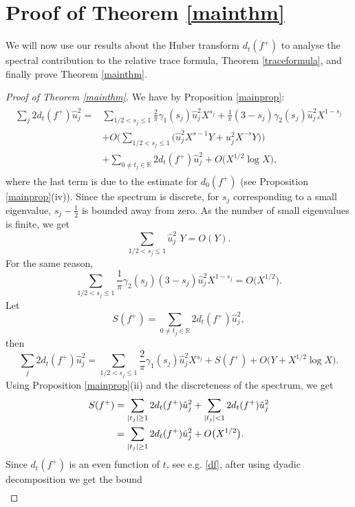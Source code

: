 \documentclass[a4paper,11pt]{amsart}
\theoremstyle{definition}
\begin{document}
\section{Proof of Theorem \ref{mainthm}}\label{Proof of counting}
We will now use our results about the Huber transform $d_t(f^{+})$ to analyse the spectral contribution to the relative trace formula, Theorem \ref{traceformula}, and finally prove Theorem \ref{mainthm}. 
\begin{proof}[Proof of Theorem \ref{mainthm}]
We have by Proposition \ref{mainprop}:
\begin{align}
    \begin{split}
        \sum_j2d_t(f^{+})\hat{u}_j^2=&\sum_{1/2<s_j\le1}\frac{2}{\pi}\gamma_1(s_j)\hat{u}_j^2X^{s_j}+\frac{1}{\pi}(3-s_j)\gamma_2(s_j)\hat{u}_j^2X^{1-s_j}\\
        &+O\Bigg(\sum_{1/2<s_j\le1}\Big(\hat{u}_j^2X^{s-1}Y+{u}_j^2X^{-s}Y\Big)\Bigg)\\
        &+\sum_{0\ne t_j\in \mathbb{R}}2d_t(f^{+})\hat{u}_j^2+O\big(X^{1/2}\log X\big),
    \end{split}
\end{align}
where the last term is due to the estimate for $d_0(f^{+})$ (see Proposition \ref{mainprop}(iv)).
Since the spectrum is discrete, for $s_j$ corresponding to a small eigenvalue, $s_j-\frac{1}{2}$ is bounded away from zero. As the number of small eigenvalues is finite, we get
$$\sum_{1/2<s_j\le1}\hat{u}_j^2\,\,Y=O(Y).$$
For the same reason,
$$\sum_{1/2<s_j\le1}\frac{1}{\pi}\gamma_2(s_j)(3-s_j)\hat{u}_j^2X^{1-s_j}=O\big(X^{1/2}\big).$$
Let $$S(f^{+})=\sum_{0\ne t_j\in \mathbb{R}}2d_t(f^{+})\hat{u}_j^2,$$
then 
\begin{equation}\label{Esf}
\sum_j2d_t(f^{+})\hat{u}_j^2=\sum_{1/2<s_j\le1}\frac{2}{\pi}\gamma_1(s_j)\hat{u}_j^2X^{s_j}+S(f^{+})+O\big(Y+X^{1/2}\log X\big).
\end{equation}
Using Proposition \ref{mainprop}(ii) and the discreteness of the spectrum, we get
\begin{align}\notag
    \begin{split}
        S(f^{+})&=\sum_{|t_j|\ge 1}2d_t(f^{+})\hat{u}_j^2+\sum_{|t_j|<1}2d_t(f^{+})\hat{u}_j^2\\
        &= \sum_{|t_j|\ge 1}2d_t(f^{+})\hat{u}_j^2+O\big(X^{1/2}\big).
    \end{split}
\end{align}
Since $d_t(f^{+})$ is an even function of $t$, see e.g. \eqref{df}, after using dyadic decomposition we get the
bound
\begin{align}\label{C-S}

\end{align}
\end{proof}
\end{document}
